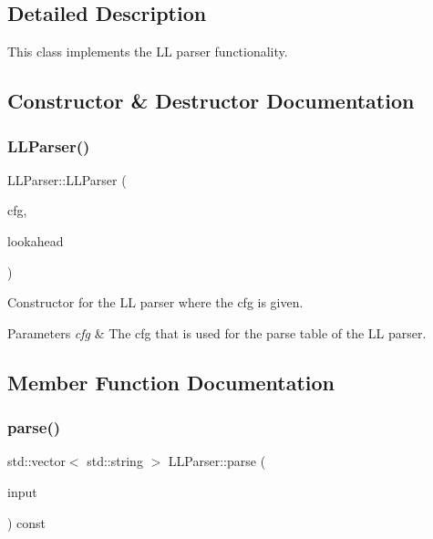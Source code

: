 \subsection{Detailed Description}
This class implements the LL parser functionality. 

\subsection{Constructor \& Destructor Documentation}
\mbox{\label{classLLParser_aaa1f2511761d90253b2507a768aebf8a}} 
\subsubsection{\texorpdfstring{L\+L\+Parser()}{LLParser()}}
{\footnotesize\ttfamily L\+L\+Parser\+::\+L\+L\+Parser (\begin{DoxyParamCaption}\item[{const \hyperlink{classCFG}{C\+FG} \&}]{cfg,  }\item[{int}]{lookahead }\end{DoxyParamCaption})}



Constructor for the LL parser where the cfg is given. 


\begin{DoxyParams}{Parameters}
{\em cfg} & The cfg that is used for the parse table of the LL parser. \\
\hline
\end{DoxyParams}


\subsection{Member Function Documentation}
\mbox{\label{classLLParser_a57e0b6627039a37977d17d8b915ee1ea}} 
\subsubsection{\texorpdfstring{parse()}{parse()}}
{\footnotesize\ttfamily std\+::vector$<$ std\+::string $>$ L\+L\+Parser\+::parse (\begin{DoxyParamCaption}\item[{std\+::string}]{input }\end{DoxyParamCaption}) const}



